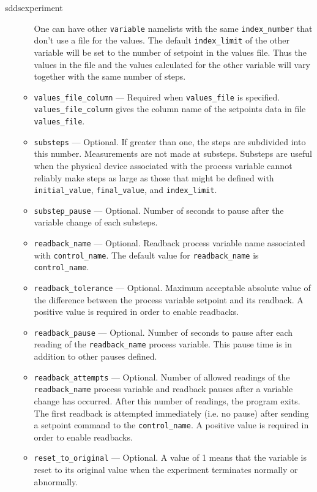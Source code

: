 \begin{sddsprog}{sddsexperiment}
\begin{itemize}
\begin{itemize}
                One can have other \verb+variable+ namelists with the same \verb+index_number+
                that don't use a file for the values.
                The default {\verb+index_limit+} of the other variable will be
                set to the number of setpoint in the values file.
                Thus the values in the file and the values calculated for the other variable
                will vary together with the same number of steps.
    \item {\verb+values_file_column+} --- Required when {\verb+values_file+} is specified.
                {\verb+values_file_column+} gives the column name of the setpoints data
                in file {\verb+values_file+}.
    \item {\verb+substeps+} --- Optional. If greater than one, the steps are subdivided into this number.
                Measurements are not made at substeps. Substeps are useful
                when the physical device associated with the process variable cannot reliably make
                steps as large as those that might be defined with {\verb+initial_value+},
                {\verb+final_value+}, and {\verb+index_limit+}.
    \item {\verb+substep_pause+} --- Optional. Number of seconds to pause after the variable change of each substeps.
    \item {\verb+readback_name+} --- Optional. Readback process variable name
                associated with {\verb+control_name+}.
                The default value for {\verb+readback_name+} is {\verb+control_name+}.
    \item {\verb+readback_tolerance+} --- Optional. Maximum acceptable
                absolute value of the difference between the process variable
                setpoint and its readback. A positive value is required in order to enable readbacks.
    \item {\verb+readback_pause+} --- Optional. Number of seconds to pause after
                each reading of the {\verb+readback_name+} process variable.
                This pause time is in addition to other pauses defined.
    \item {\verb+readback_attempts+} --- Optional. Number of allowed readings
                of the {\verb+readback_name+} process variable
                and readback pauses after a variable change has occurred.
                After this number of readings, the program exits.
                The first readback is attempted immediately (i.e. no pause) after
                sending a setpoint command to the {\verb+control_name+}.
                A positive value is required in order to enable readbacks.
    \item {\verb+reset_to_original+} --- Optional. A value of 1 means
                that the variable is reset to its original value when the
                experiment terminates normally or abnormally.
  \end{itemize}


\end{itemize}
\end{sddsprog}
